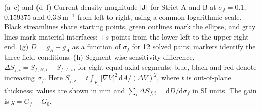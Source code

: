 (a--c) and (d--f) Current-density magnitude $|\mathbf{J}|$ for Strict A and B at $\sigma_f=0.1$, $0.159375$ and $0.3\,\mathrm{S\,m^{-1}}$ from left to right, using a common logarithmic scale. Black streamlines share starting points, green outlines mark the ellipse, and gray lines mark material interfaces; $+s$ points from the lower-left to the upper-right end. (g) $D=g_B-g_A$ as a function of $\sigma_f$ for 12 solved pairs; markers identify the three field conditions. (h) Segment-wise sensitivity difference, $\Delta S_{f,i}=S_{f,B,i}-S_{f,A,i}$, for eight equal axial segments; blue, black and red denote increasing $\sigma_f$. Here $S_{f,i}=t\int_{F_i}|\nabla V|^2\,\mathrm{d}A/(\Delta V)^2$, where $t$ is out-of-plane thickness; values are shown in mm and $\sum_i\Delta S_{f,i}=\mathrm{d}D/\mathrm{d}\sigma_f$ in SI units. The gain is $g=G_f-G_0$.
